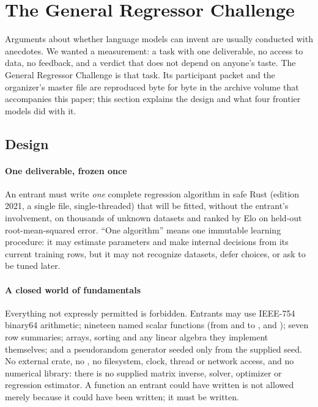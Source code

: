 \section{The General Regressor Challenge}
\label{sec:challenge}

Arguments about whether language models can invent are usually conducted with anecdotes. We
wanted a measurement: a task with one deliverable, no access to data, no feedback, and a
verdict that does not depend on anyone's taste. The General Regressor Challenge
\citep{jopedime2026challenge} is that task. Its participant packet and the organizer's master file
are reproduced byte for byte in the archive volume that accompanies this paper; this section explains
the design and what four frontier models did with it.

\subsection{Design}

\paragraph{One deliverable, frozen once} An entrant must write \emph{one} complete regression
algorithm in safe Rust (edition 2021, a single file, single-threaded) that will be fitted,
without the entrant's involvement, on thousands of unknown datasets and ranked by Elo on
held-out root-mean-squared error. ``One algorithm'' means one immutable learning procedure:
it may estimate parameters and make internal decisions from its current training rows, but it
may not recognize datasets, defer choices, or ask to be tuned later.

\paragraph{A closed world of fundamentals} Everything not expressly permitted is forbidden.
Entrants may use IEEE-754 binary64 arithmetic; nineteen named scalar functions (from
 and  to ,  and ); seven row summaries;
arrays, sorting and any linear algebra they implement themselves; and a pseudorandom generator
seeded only from the supplied seed. No external crate, no , no filesystem, clock,
thread or network access, and no numerical library: there is no supplied matrix inverse,
solver, optimizer or regression estimator. A function an entrant could have written is not
allowed merely because it could have been written; it must be written.

